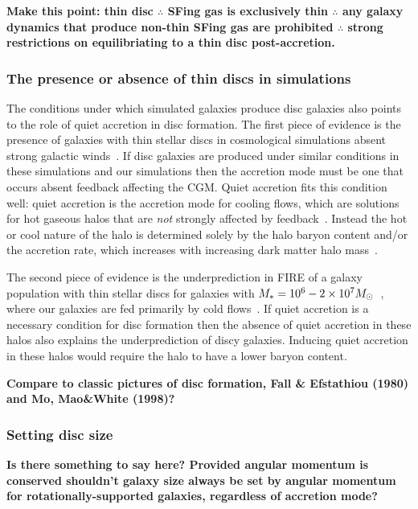 \documentclass[fleqn,usenatbib]{mnras}
\begin{document}
\textbf{
Make this point:
thin disc $\therefore$
SFing gas is exclusively thin $\therefore$
any galaxy dynamics that produce non-thin SFing gas are prohibited $\therefore$
strong restrictions on equilibriating to a thin disc post-accretion.
}

\subsubsection{The presence or absence of thin discs in simulations}
\label{s: disc formation -- population}

The conditions under which simulated galaxies produce disc galaxies also points to the role of quiet accretion in disc formation.
The first piece of evidence is the presence of galaxies with thin stellar discs in cosmological simulations absent strong galactic winds~\citep{Guedes2011, Bird2013}.
If disc galaxies are produced under similar conditions in these simulations and our simulations then the accretion mode must be one that occurs absent feedback affecting the CGM.
Quiet accretion fits this condition well:
quiet accretion is the accretion mode for cooling flows, which are solutions for hot gaseous halos that are \textit{not} strongly affected by feedback~\citep{Stern2019}.
Instead the hot or cool nature of the halo is determined solely by the halo baryon content and/or the accretion rate, which increases with increasing dark matter halo mass~\citep{Stern2020a}.

The second piece of evidence is the underprediction in FIRE of a galaxy population with thin stellar discs for galaxies with $M_* = 10^6 \-- 2 \times 10^7 M_\odot$~\citep{El-Badry2018a}, where our galaxies are fed primarily by cold flows~\citep{Stern2020}.
If quiet accretion is a necessary condition for disc formation then the absence of quiet accretion in these halos also explains the underprediction of discy galaxies.
Inducing quiet accretion in these halos would require the halo to have a lower baryon content.

\textbf{
Compare to classic pictures of disc formation, Fall \& Efstathiou (1980) and Mo, Mao\&White (1998)?
}

\subsubsection{Setting disc size}
\label{s: disc formation -- disc size}

\textbf{
Is there something to say here?
Provided angular momentum is conserved shouldn't galaxy size always be set by angular momentum for rotationally-supported galaxies, regardless of accretion mode?
}
\end{document}
